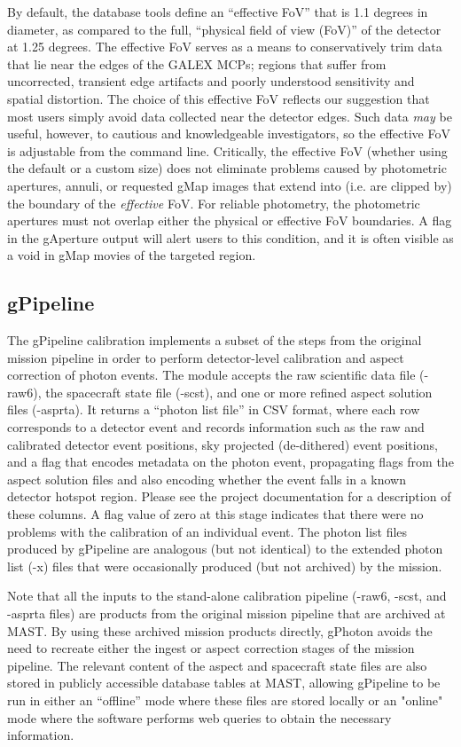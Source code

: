 \documentclass[preprint]{aastex}
\begin{document}
By default, the database tools define an ``effective FoV'' that is 1.1 degrees in diameter, as compared to the full, ``physical field of view (FoV)'' of the detector at 1.25 degrees. The effective FoV serves as a means to conservatively trim data that lie near the edges of the GALEX MCPs; regions that suffer from uncorrected, transient edge artifacts and poorly understood sensitivity and spatial distortion. The choice of this effective FoV reflects our suggestion that most users simply avoid data collected near the detector edges. Such data \emph{may} be useful, however, to cautious and knowledgeable investigators, so the effective FoV is adjustable from the command line. Critically, the effective FoV (whether using the default or a custom size) does not eliminate problems caused by photometric apertures, annuli, or requested gMap images that extend into (i.e. are clipped by) the boundary of the \emph{effective} FoV. For reliable photometry, the photometric apertures must not overlap either the physical or effective FoV boundaries. A flag in the gAperture output will alert users to this condition, and it is often visible as a void in gMap movies of the targeted region.

\subsection{gPipeline}
The gPipeline calibration implements a subset of the steps from the original mission pipeline in order to perform detector-level calibration and aspect correction of photon events. The module accepts the raw scientific data file (-raw6), the spacecraft state file (-scst), and one or more refined aspect solution files (-asprta). It returns a ``photon list file'' in CSV format, where each row corresponds to a detector event and records information such as the raw and calibrated detector event positions, sky projected (de-dithered) event positions, and a flag that encodes metadata on the photon event, propagating flags from the aspect solution files and also encoding whether the event falls in a known detector hotspot region. Please see the project documentation for a description of these columns. A flag value of zero at this stage indicates that there were no problems with the calibration of an individual event. The photon list files produced by gPipeline are analogous (but not identical) to the extended photon list (-x) files that were occasionally produced (but not archived) by the mission.

Note that all the inputs to the stand-alone calibration pipeline (-raw6, -scst, and -asprta files) are products from the original mission pipeline that are archived at MAST. By using these archived mission products directly, gPhoton avoids the need to recreate either the ingest or aspect correction stages of the mission pipeline. The relevant content of the aspect and spacecraft state files are also stored in publicly accessible database tables at MAST, allowing gPipeline to be run in either an ``offline'' mode where these files are stored locally or an "online" mode where the software performs web queries to obtain the necessary information.
\end{document}
